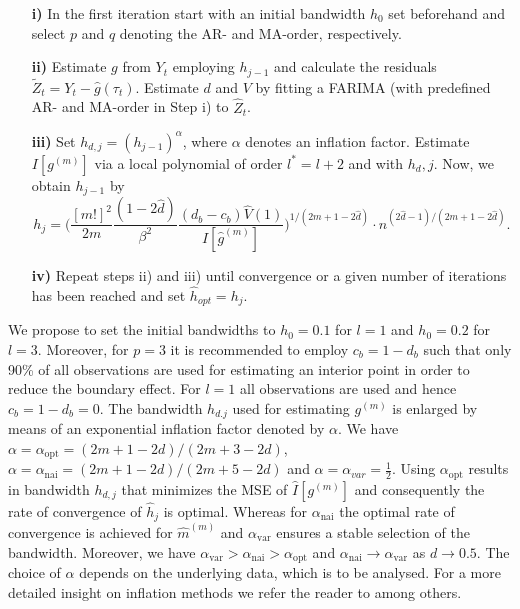 \documentclass[12pt]{article}
\begin{document}
\begin{itemize}
	\item[\textbf{i)}] In the first iteration start with an initial bandwidth $h_0$ set beforehand and select $p$ and $q$ denoting the AR- and MA-order, respectively. 

	\item [\textbf{ii)}] Estimate $g$ from $Y_t$ employing $h_{j-1}$ and calculate the residuals $\tilde{Z}_t = Y_t - \hat{g}(\tau_t)$. Estimate $d$ and $V$ by fitting a FARIMA (with predefined AR- and MA-order in Step i) to  $\hat{Z}_t$.
			
	\item [\textbf{iii)}] Set $h_{d,j}=(h_{j-1})^\alpha$, where $\alpha$ denotes an 
		inflation factor. Estimate $I[g^{(m)}]$ via a local polynomial of order $l^* = l + 2$ and with $h_d,j$. Now, we obtain $h_{j-1}$ by 
		\begin{equation}
			h_j=\Bigg(\frac{[m!]^2}{2m} \frac{(1-2\hat{d})}{\beta^2}\frac{(d_b - c_b)\hat{V}(1)}{I[\hat{g}^{(m)}]}\Bigg)^{1/(2m+1-2\hat{d})}\cdot n^{(2\hat{d}-1)/(2m+1-2\hat{d})}.
		\end{equation}
	
	\item [\textbf{iv)}] Repeat steps ii) and iii) until convergence or a given number of iterations has been reached and set $\hat{h}_{opt} = h_j$.	
\end{itemize}
We propose to set the initial bandwidths to $h_0 = 0.1$ for $l = 1$ and $h_0 = 0.2$ for $l = 3$. Moreover, for $p = 3$ it is recommended to employ $c_b = 1 - d_b$ such that only 90\% of all observations are used for estimating an interior point in order to reduce the boundary effect. For $l = 1$ all observations are used and hence $c_b = 1 - d_b = 0$. The bandwidth $h_{d.j}$ used for estimating $g^{(m)}$ is enlarged by means of an exponential inflation factor denoted by $\alpha$. We have $\alpha = \alpha_{\text{opt}} = (2m + 1 - 2d) / (2m + 3 - 2d)$, $\alpha = \alpha_{\text{nai}} = (2m + 1 - 2d) / (2m + 5 - 2d)$ and $\alpha = \alpha_{var} = \frac{1}{2}$. Using $\alpha_{\text{opt}}$ results in bandwidth $h_{d,j}$ that minimizes the MSE of $\hat{I}[g^{(m)}]$ and consequently the rate of convergence of $\hat{h}_j$ is optimal. Whereas for $\alpha_{\text{nai}}$ the optimal rate of convergence is achieved for $\hat{m}^{(m)}$ and $\alpha_{\text{var}}$ ensures a stable selection of the bandwidth. Moreover, we have $\alpha_{\text{var}} > \alpha_{\text{nai}} > \alpha_{\text{opt}}$ and $\alpha_{\text{nai}} \rightarrow \alpha_{\text{var}}$ as $d \rightarrow 0.5$. The choice of $\alpha$ depends on the underlying data, which is to be analysed. For a more detailed insight on inflation methods we refer the reader to \citet{beran2002iterative} among others.   
\end{document}
